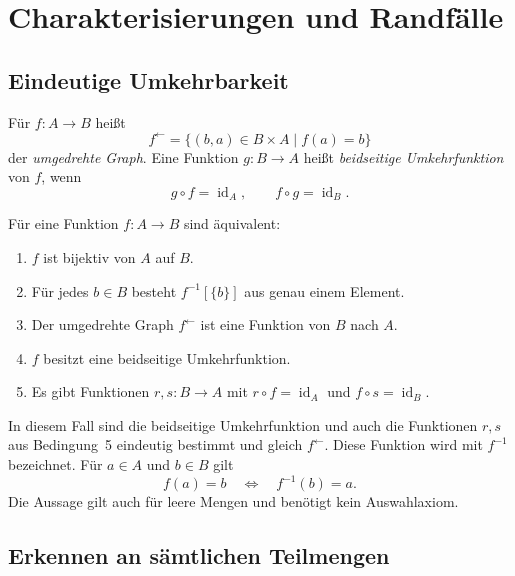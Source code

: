 \chapter{Charakterisierungen und Randfälle}
\label{b08guide:ch:criteria}

\section{Eindeutige Umkehrbarkeit}

\begin{definition}
\label{b08guide:def:inverse}
Für $f\colon A\to B$ heißt
\[
 f^{\leftarrow}=\{(b,a)\in B\times A\mid f(a)=b\}
\]
der \emph{umgedrehte Graph}. Eine Funktion $g\colon B\to A$
heißt \emph{beidseitige Umkehrfunktion} von $f$, wenn
\[
 g\circ f=\operatorname{id}_A,
 \qquad f\circ g=\operatorname{id}_B.
\]
\end{definition}

\begin{theorem}
\label{b08guide:thm:inversecriteria}
Für eine Funktion $f\colon A\to B$ sind äquivalent:
\begin{enumerate}
\item $f$ ist bijektiv von $A$ auf $B$.
\item Für jedes $b\in B$ besteht $f^{-1}[\{b\}]$ aus genau einem Element.
\item Der umgedrehte Graph $f^{\leftarrow}$ ist eine Funktion von $B$ nach $A$.
\item $f$ besitzt eine beidseitige Umkehrfunktion.
\item Es gibt Funktionen $r,s\colon B\to A$ mit
      $r\circ f=\operatorname{id}_A$ und $f\circ s=\operatorname{id}_B$.
\end{enumerate}
In diesem Fall sind die beidseitige Umkehrfunktion und auch die
Funktionen $r,s$ aus Bedingung~5 eindeutig bestimmt und gleich
$f^{\leftarrow}$. Diese Funktion wird mit $f^{-1}$ bezeichnet.
Für $a\in A$ und $b\in B$ gilt
\[
 f(a)=b\quad\Longleftrightarrow\quad f^{-1}(b)=a.
\]
Die Aussage gilt auch für leere Mengen und benötigt kein Auswahlaxiom.
\end{theorem}

\section{Erkennen an sämtlichen Teilmengen}

